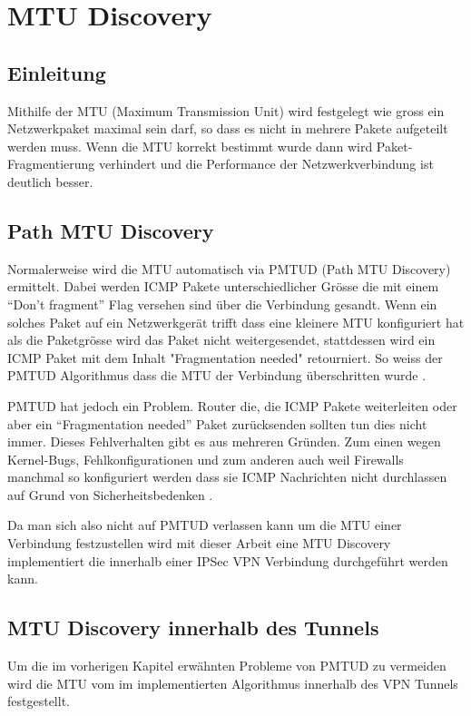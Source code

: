 \section{MTU Discovery}
\label{sec:MTU Discovery}

\subsection{Einleitung}
Mithilfe der \acs{MTU} (Maximum Transmission Unit) wird festgelegt wie gross ein Netzwerkpaket maximal sein darf, so dass es nicht in mehrere Pakete aufgeteilt werden muss. Wenn die \acs{MTU} korrekt bestimmt wurde dann wird Paket-Fragmentierung verhindert und die Performance der Netzwerkverbindung ist deutlich besser. 

\subsection{Path MTU Discovery}
Normalerweise wird die \acs{MTU} automatisch via \acs{PMTUD} (Path MTU Discovery) ermittelt. Dabei werden \acs{ICMP} Pakete unterschiedlicher Grösse die mit einem \enquote{Don't fragment} Flag versehen sind über die Verbindung gesandt. Wenn ein solches Paket auf ein Netzwerkgerät trifft dass eine kleinere \acs{MTU} konfiguriert hat als die Paketgrösse wird das Paket nicht weitergesendet, stattdessen wird ein \acs{ICMP} Paket mit dem Inhalt "Fragmentation needed" retourniert. So weiss der \acs{PMTUD} Algorithmus dass die \acs{MTU} der Verbindung überschritten wurde \cite[:131]{rfc1191}.

\acs{PMTUD} hat jedoch ein Problem. Router die, die \acs{ICMP} Pakete weiterleiten oder aber ein \enquote{Fragmentation needed} Paket zurücksenden sollten tun dies nicht immer. Dieses Fehlverhalten gibt es aus mehreren Gründen. Zum einen wegen Kernel-Bugs, Fehlkonfigurationen und zum anderen auch weil Firewalls manchmal so konfiguriert werden dass sie \acs{ICMP} Nachrichten nicht durchlassen auf Grund von Sicherheitsbedenken \cite[:137]{rfc2923}.

Da man sich also nicht auf \acs{PMTUD} verlassen kann um die \acs{MTU} einer Verbindung festzustellen wird mit dieser Arbeit eine \acs{MTU} Discovery implementiert die innerhalb einer \acs{IPSec} \acs{VPN} Verbindung durchgeführt werden kann.

\subsection{MTU Discovery innerhalb des Tunnels}
Um die im vorherigen Kapitel erwähnten Probleme von \acs{PMTUD} zu vermeiden wird die \acs{MTU} vom im \tool implementierten Algorithmus innerhalb des \acs{VPN} Tunnels festgestellt.

